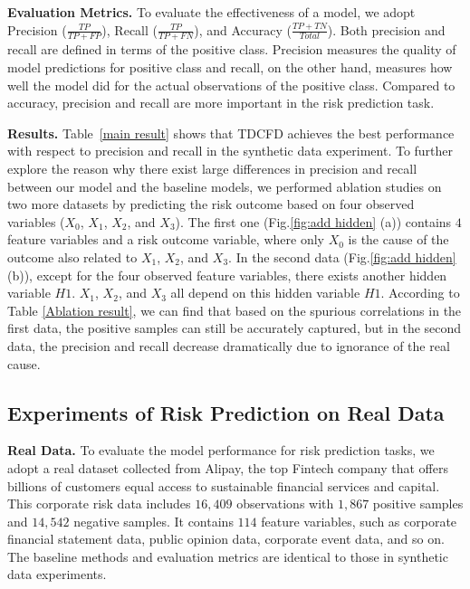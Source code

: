 \documentclass[letterpaper]{article} %
\theoremstyle{definition}
\theoremstyle{remark}
\begin{document}
\noindent\textbf{Evaluation Metrics.}
To evaluate the effectiveness of a model, we adopt Precision ($\frac{TP}{TP+FP}$), Recall ($\frac{TP}{TP+FN}$), and Accuracy ($\frac{TP+TN}{Total}$). Both precision and recall are defined in terms of the positive class. Precision measures the quality of model predictions for positive class and recall, on the other hand, measures how well the model did for the actual observations of the positive class. Compared to accuracy, precision and recall are more important in the risk prediction task.


\noindent\textbf{Results.}
Table~\ref{main result} shows that TDCFD achieves the best performance with respect to precision and recall in the synthetic data experiment. To further explore the reason why there exist large differences in precision and recall between our model and the baseline models, we performed ablation studies on two more datasets by predicting the risk outcome based on four observed variables ($X_0$, $X_1$, $X_2$, and $X_3$). The first one (Fig.\ref{fig:add hidden} (a)) contains $4$ feature variables and a risk outcome variable, where only $X_0$ is the cause of the outcome also related to $X_1$, $X_2$, and $X_3$. In the second data (Fig.\ref{fig:add hidden} (b)), except for the four observed feature variables, there exists another hidden variable $H1$. $X_1$, $X_2$, and $X_3$ all depend on this hidden variable $H1$. According to Table \ref{Ablation result}, we can find that based on the spurious correlations in the first data, the positive samples can still be accurately captured, but in the second data, the precision and recall decrease dramatically due to ignorance of the real cause.

\vspace{-0.94mm}
\subsection{Experiments of Risk Prediction on Real Data}


\noindent\textbf{Real Data.}
To evaluate the model performance for risk prediction tasks, we adopt a real dataset collected from Alipay, the top Fintech company that offers billions of customers equal access to sustainable financial services and capital. This corporate risk data includes $16,409$ observations with $1,867$ positive samples and $14,542$ negative samples. It contains $114$ feature variables, such as corporate financial statement data, public opinion data, corporate event data, and so on. The baseline methods and evaluation metrics are identical to those in synthetic data experiments.
\end{document}
